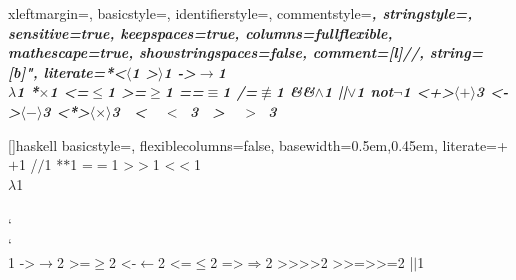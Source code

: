 {
 xleftmargin=\parindent,
 basicstyle=\upshape,
 identifierstyle=\sffamily,
 commentstyle=\itshape\bfseries,
 stringstyle=\ttfamily,
 sensitive=true,
 keepspaces=true,
 columns=fullflexible,
 mathescape=true,
 showstringspaces=false,
 comment=[l]//,
 string=[b]{"},
 literate=*{<}{$\langle$}{1} {>}{$\rangle$}{1} {->}{$\rightarrow$}{1}
                {\\}{$\lambda$}{1}
                {*}{$\times$}{1}
                {<=}{$\le$}{1} {>=}{$\ge$}{1}
                {==}{$\equiv$}{1} {/=}{$\not\equiv$}{1}
                {&&}{$\land$}{1}
                {||}{$\lor$}{1}
                {not}{$\lnot$}{1}
                {<+>}{$\langle + \rangle$}{3}
                {<->}{$\langle - \rangle$}{3}
                {<*>}{$\langle \times \rangle$}{3}
                {\ <\ }{\ $<$\ }{3} {\ >\ }{\ $>$\ }{3}
}

[]{haskell}{
 basicstyle=\ttfamily,
 flexiblecolumns=false,
 basewidth={0.5em,0.45em},
 literate={+}{{$+$}}1 {/}{{$/$}}1 {*}{{$*$}}1 {=}{{$=$}}1
          {>}{{$>$}}1 {<}{{$<$}}1 {\\}{{$\lambda$}}1
          {\\\\}{{\char`\\\char`\\}}1
          {->}{{$\rightarrow$}}2 {>=}{{$\ge$}}2 {<-}{{$\leftarrow$}}2
          {<=}{{$\le$}}2 {=>}{{$\Rightarrow$}}2
          {>>}{{>>}}2 {>>=}{{>>=}}2
          {|}{{$\mid$}}1}

\newcommand\maybecolor[1]{\ifdraft{\color{#1}}{}}
\newcommand{\displaycomment}[1]{\ifdraft{#1{}}{}}


\newcommand{\TODO}[2]{\displaycomment{{\maybecolor{red}{\bf #1: }{{\maybecolor{blue}#2}}}}}
\newcommand{\Remark}[2]{\displaycomment{{\maybecolor{dkgreen} {\bf
        #1:} #2}}}

\newcommand{\JA}[1]{\TODO{Jesper}{#1}}
\newcommand{\ja}[1]{\Remark{Jesper}{#1}}
\newcommand{\PB}[1]{\TODO{Patrick}{#1}}
\newcommand{\pb}[1]{\Remark{Patrick}{#1}}
\newcommand{\TOM}[1]{\TODO{Tom}{#1}}
\newcommand{\tom}[1]{\Remark{Tom}{#1}}


